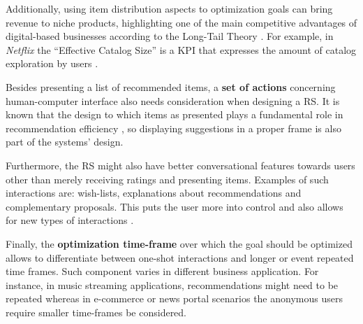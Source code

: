 
    Additionally, using item distribution aspects to optimization goals can bring revenue to niche products, highlighting one of the main competitive advantages of digital-based businesses according to the Long-Tail Theory \cite{2006LongTail}. For example, in \textit{Netflix} the ``Effective Catalog Size'' is a KPI that expresses the amount of catalog exploration by users \cite{2016NetflixBusinessValue}.


    Besides presenting a list of recommended items, a \textbf{set of actions} concerning human-computer interface also needs consideration when designing a RS. It is known that the design to which items as presented plays a fundamental role in recommendation efficiency \cite{2012UserExperience}, so displaying suggestions in a proper frame is also part of the systems' design. 
    
    Furthermore, the RS might also have better conversational features towards users other than merely receiving ratings and presenting items. Examples of such interactions are: wish-lists, explanations about recommendations and complementary proposals. This puts the user more into control and also   allows for new types of interactions \cite{2016BeyondMatrixCompletion}.  

    Finally, the \textbf{optimization time-frame} over which the goal should be optimized allows to differentiate between one-shot interactions and longer or event repeated time frames. Such component varies in different business application. For instance, in music streaming applications, recommendations might need to be repeated whereas in e-commerce or news portal scenarios the anonymous users require smaller time-frames be considered. 


